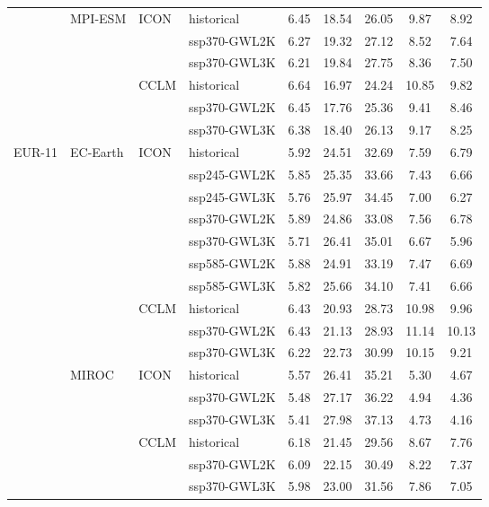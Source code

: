 \begin{table}[!htbp]
{\begin{tabular}{lll|l|c|c|c|c|c}
\cmidrule(lr){3-9}
\cmidrule(lr){2-9}
 & \multirow{6}{*}{MPI-ESM} & \multirow{3}{*}{ICON} & historical & 6.45 & 18.54 & 26.05 & 9.87 & 8.92 \\
 &  &  & ssp370-GWL2K & 6.27 & 19.32 & 27.12 & 8.52 & 7.64 \\
 &  &  & ssp370-GWL3K & 6.21 & 19.84 & 27.75 & 8.36 & 7.50 \\
\cmidrule(lr){3-9}
 &  & \multirow{3}{*}{CCLM} & historical & 6.64 & 16.97 & 24.24 & 10.85 & 9.82 \\
 &  &  & ssp370-GWL2K & 6.45 & 17.76 & 25.36 & 9.41 & 8.46 \\
 &  &  & ssp370-GWL3K & 6.38 & 18.40 & 26.13 & 9.17 & 8.25 \\
\midrule
\multirow{22}{*}{EUR-11} & \multirow{10}{*}{EC-Earth} & \multirow{7}{*}{ICON} & historical & 5.92 & 24.51 & 32.69 & 7.59 & 6.79 \\
 &  &  & ssp245-GWL2K & 5.85 & 25.35 & 33.66 & 7.43 & 6.66 \\
 &  &  & ssp245-GWL3K & 5.76 & 25.97 & 34.45 & 7.00 & 6.27 \\
 &  &  & ssp370-GWL2K & 5.89 & 24.86 & 33.08 & 7.56 & 6.78 \\
 &  &  & ssp370-GWL3K & 5.71 & 26.41 & 35.01 & 6.67 & 5.96 \\
 &  &  & ssp585-GWL2K & 5.88 & 24.91 & 33.19 & 7.47 & 6.69 \\
 &  &  & ssp585-GWL3K & 5.82 & 25.66 & 34.10 & 7.41 & 6.66 \\
\cmidrule(lr){3-9}
 &  & \multirow{3}{*}{CCLM} & historical & 6.43 & 20.93 & 28.73 & 10.98 & 9.96 \\
 &  &  & ssp370-GWL2K & 6.43 & 21.13 & 28.93 & 11.14 & 10.13 \\
 &  &  & ssp370-GWL3K & 6.22 & 22.73 & 30.99 & 10.15 & 9.21 \\
\cmidrule(lr){3-9}
\cmidrule(lr){2-9}
 & \multirow{6}{*}{MIROC} & \multirow{3}{*}{ICON} & historical & 5.57 & 26.41 & 35.21 & 5.30 & 4.67 \\
 &  &  & ssp370-GWL2K & 5.48 & 27.17 & 36.22 & 4.94 & 4.36 \\
 &  &  & ssp370-GWL3K & 5.41 & 27.98 & 37.13 & 4.73 & 4.16 \\
\cmidrule(lr){3-9}
 &  & \multirow{3}{*}{CCLM} & historical & 6.18 & 21.45 & 29.56 & 8.67 & 7.76 \\
 &  &  & ssp370-GWL2K & 6.09 & 22.15 & 30.49 & 8.22 & 7.37 \\
 &  &  & ssp370-GWL3K & 5.98 & 23.00 & 31.56 & 7.86 & 7.05 \\

\end{tabular}}
\end{table}
